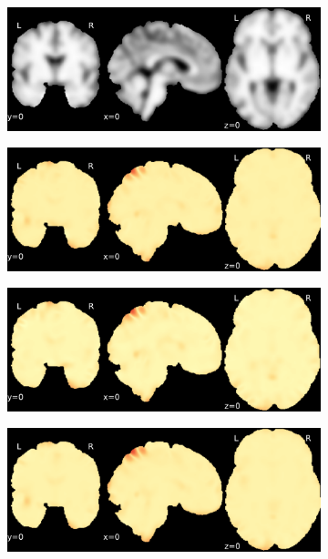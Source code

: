 \documentclass{article}
\begin{document}
\begin{appendices}
\begin{landscape}
\begin{figure}
            \begin{subfigure}[t]{0.2\paperheight}
                \centering
                \includegraphics[width=\textwidth]{figures/sig/10mm/ieee_ds002338_sub-xp207.pdf}
            \end{subfigure}
            \begin{subfigure}[t]{0.2\paperheight}
                \centering
                \includegraphics[width=\textwidth]{figures/sig/10mm/rr_ds002338_sub-xp207_sig.pdf}
            \end{subfigure}
            \begin{subfigure}[t]{0.2\paperheight}
                \centering
                \includegraphics[width=\textwidth]{figures/sig/10mm/rs_ds002338_sub-xp207_sig.pdf}
            \end{subfigure}
            \begin{subfigure}[t]{0.2\paperheight}
                \centering
                \includegraphics[width=\textwidth]{figures/sig/10mm/rr.rs_ds002338_sub-xp207_sig.pdf}

\end{subfigure}
\end{figure}
\end{landscape}
\end{appendices}
\end{document}
